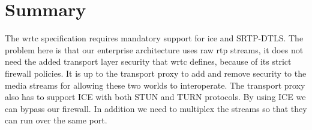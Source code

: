 \section{Summary}
The \gls{wrtc} specification requires mandatory support for \gls{ice} and SRTP-DTLS. The problem here is that our enterprise architecture uses raw \gls{rtp} streams, it does not need the added transport layer security that \gls{wrtc} defines, because of its strict firewall policies. It is up to the transport proxy to add and remove security to the media streams for allowing these two worlds to interoperate. The transport proxy also has to support ICE with both STUN and TURN protocols. By using ICE we can bypass our firewall. In addition we need to multiplex the streams so that they can run over the same port.